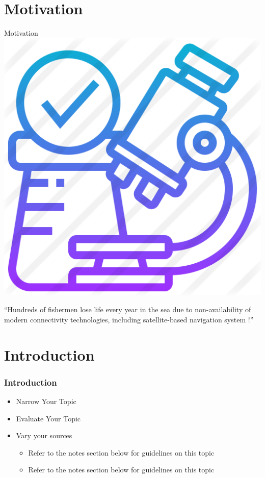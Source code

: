 \documentclass[aspectratio=169,mathserif]{beamer}
\begin{document}
\section{Motivation} 
\begin{frame}{Motivation}
\centering
    \includegraphics[scale=0.3]{figs/research.png}
\begin{exampleblock}{}
  { ``Hundreds of fishermen lose life every year in the sea due to non-availability of modern connectivity technologies, including satellite-based navigation system !''}
\end{exampleblock}
\end{frame}
\section{Introduction} 
\begin{frame}
\frametitle{Introduction}
\begin{itemize}
\justifying
\item Narrow Your Topic
\item Evaluate Your Topic
\item Vary your sources
\begin{itemize}
\item Refer to the notes section below  for guidelines on this topic
\pause
\item Refer to the notes section below  for guidelines on this topic
\end{itemize}
\end{itemize}
\end{frame}
\end{document}
